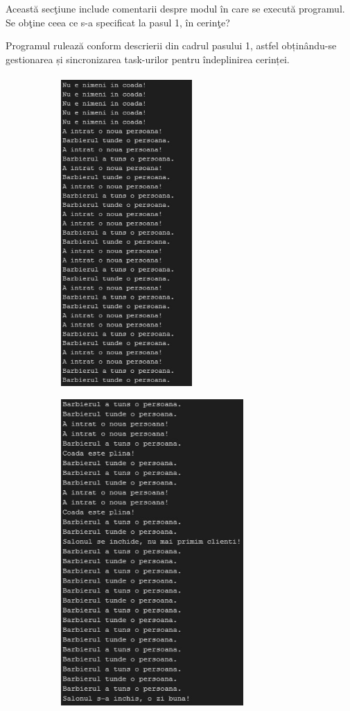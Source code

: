 \documentclass[a4paper, 11pt]{article}
\begin{document}
{{Aceast\u{a} sec\c{t}iune include comentarii despre modul \^{i}n care se execut\u{a} programul. Se ob\c{t}ine ceea ce s-a specificat la pasul 1, \^{i}n cerin\c{t}e?

Programul rulează conform descrierii din cadrul pasului 1, astfel obținându-se gestionarea și sincronizarea task-urilor pentru îndeplinirea cerinței.

\paragraph{}

\begin{figure} [!htb]
\centering
\begin{subfigure}{.5\textwidth}
  \centering
  \includegraphics[width=5cm]{./images/Rezultat1.jpeg}
  \caption{}
  \label{fig:sub1}
\end{subfigure}%
\begin{subfigure}{.5\textwidth}
  \centering
  \includegraphics[width=6.95cm]{./images/Rezultat2.jpeg}

\end{subfigure}
\end{figure}}}
\end{document}
